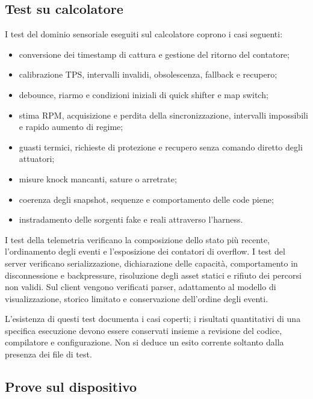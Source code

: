 \documentclass{article}
\begin{document}
\subsection{Test su calcolatore}

I test del dominio sensoriale eseguiti sul calcolatore coprono i casi seguenti:

\begin{itemize}
    \item conversione dei timestamp di cattura e gestione del ritorno del
          contatore;
    \item calibrazione TPS, intervalli invalidi, obsolescenza, fallback e
          recupero;
    \item debounce, riarmo e condizioni iniziali di quick shifter e map switch;
    \item stima RPM, acquisizione e perdita della sincronizzazione, intervalli
          impossibili e rapido aumento di regime;
    \item guasti termici, richieste di protezione e recupero senza comando
          diretto degli attuatori;
    \item misure knock mancanti, sature o arretrate;
    \item coerenza degli snapshot, sequenze e comportamento delle code piene;
    \item instradamento delle sorgenti fake e reali attraverso l'harness.
\end{itemize}

I test della telemetria verificano la composizione dello stato più recente,
l'ordinamento degli eventi e l'esposizione dei contatori di overflow. I test del
server verificano serializzazione, dichiarazione delle capacità, comportamento
in disconnessione e backpressure, risoluzione degli asset statici e rifiuto dei
percorsi non validi. Sul client vengono verificati parser, adattamento al modello
di visualizzazione, storico limitato e conservazione dell'ordine degli eventi.

L'esistenza di questi test documenta i casi coperti; i risultati quantitativi
di una specifica esecuzione devono essere conservati insieme a revisione del
codice, compilatore e configurazione. Non si deduce un esito corrente soltanto
dalla presenza dei file di test.

\subsection{Prove sul dispositivo}
\end{document}
